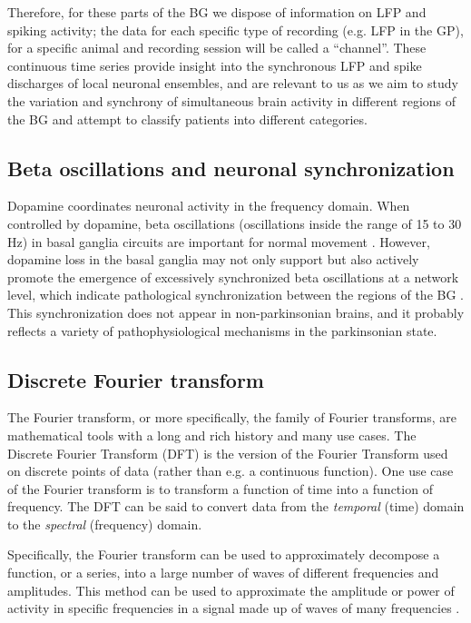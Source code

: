 \documentclass{article}
\begin{document}
Therefore, for these parts of the BG we dispose of information on LFP and spiking activity; the data for each specific type of recording (e.g. LFP in the GP), for a specific animal and recording session will be called a “channel”. 
These continuous time series provide insight into the synchronous LFP and spike discharges of local neuronal ensembles, and are relevant to us as we aim to study the variation and synchrony of simultaneous brain activity in different regions of the BG and attempt to classify patients into different categories.

\subsection{Beta oscillations and neuronal synchronization}\label{BG BetaOsc NeurSyn}

Dopamine coordinates neuronal activity in the frequency domain. 
When controlled by dopamine, beta oscillations (oscillations inside the range of 15 to 30 Hz) in basal ganglia circuits are important for normal movement \citep{Cagnan}. 
However, dopamine loss in the basal ganglia may not only support but also actively promote the emergence of excessively synchronized beta oscillations at a network level, which indicate pathological synchronization between the regions of the BG \citep{Hammond}. 
This synchronization does not appear in non-parkinsonian brains, and it probably reflects a variety of pathophysiological mechanisms in the parkinsonian state.

\subsection{Discrete Fourier transform}\label{DFT BG}

The Fourier transform, or more specifically, the family of Fourier transforms, are mathematical tools with a long and rich history and many use cases. 
The Discrete Fourier Transform (DFT) is the version of the Fourier Transform used on discrete points of data (rather than e.g. a continuous function). 
One use case of the Fourier transform is to transform a function of time into a function of frequency. 
The DFT can be said to convert data from the \textit{temporal} (time) domain to the \textit{spectral} (frequency) domain.

Specifically, the Fourier transform can be used to approximately decompose a function, or a series, into a large number of waves of different frequencies and amplitudes. 
This method can be used to approximate the amplitude or power of activity in specific frequencies in a signal made up of waves of many frequencies \citep{Fourier}.
\end{document}
